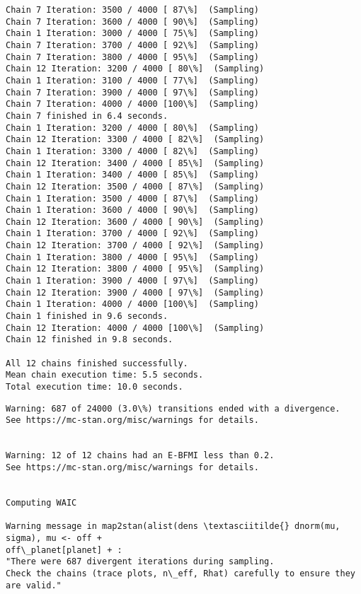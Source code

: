 \documentclass[11pt]{article}
\begin{document}
\begin{Verbatim}[commandchars=\\\{\}]
Chain 7 Iteration: 3500 / 4000 [ 87\%]  (Sampling)
Chain 7 Iteration: 3600 / 4000 [ 90\%]  (Sampling)
Chain 1 Iteration: 3000 / 4000 [ 75\%]  (Sampling)
Chain 7 Iteration: 3700 / 4000 [ 92\%]  (Sampling)
Chain 7 Iteration: 3800 / 4000 [ 95\%]  (Sampling)
Chain 12 Iteration: 3200 / 4000 [ 80\%]  (Sampling)
Chain 1 Iteration: 3100 / 4000 [ 77\%]  (Sampling)
Chain 7 Iteration: 3900 / 4000 [ 97\%]  (Sampling)
Chain 7 Iteration: 4000 / 4000 [100\%]  (Sampling)
Chain 7 finished in 6.4 seconds.
Chain 1 Iteration: 3200 / 4000 [ 80\%]  (Sampling)
Chain 12 Iteration: 3300 / 4000 [ 82\%]  (Sampling)
Chain 1 Iteration: 3300 / 4000 [ 82\%]  (Sampling)
Chain 12 Iteration: 3400 / 4000 [ 85\%]  (Sampling)
Chain 1 Iteration: 3400 / 4000 [ 85\%]  (Sampling)
Chain 12 Iteration: 3500 / 4000 [ 87\%]  (Sampling)
Chain 1 Iteration: 3500 / 4000 [ 87\%]  (Sampling)
Chain 1 Iteration: 3600 / 4000 [ 90\%]  (Sampling)
Chain 12 Iteration: 3600 / 4000 [ 90\%]  (Sampling)
Chain 1 Iteration: 3700 / 4000 [ 92\%]  (Sampling)
Chain 12 Iteration: 3700 / 4000 [ 92\%]  (Sampling)
Chain 1 Iteration: 3800 / 4000 [ 95\%]  (Sampling)
Chain 12 Iteration: 3800 / 4000 [ 95\%]  (Sampling)
Chain 1 Iteration: 3900 / 4000 [ 97\%]  (Sampling)
Chain 12 Iteration: 3900 / 4000 [ 97\%]  (Sampling)
Chain 1 Iteration: 4000 / 4000 [100\%]  (Sampling)
Chain 1 finished in 9.6 seconds.
Chain 12 Iteration: 4000 / 4000 [100\%]  (Sampling)
Chain 12 finished in 9.8 seconds.

All 12 chains finished successfully.
Mean chain execution time: 5.5 seconds.
Total execution time: 10.0 seconds.

    \end{Verbatim}

    \begin{Verbatim}[commandchars=\\\{\}]
Warning: 687 of 24000 (3.0\%) transitions ended with a divergence.
See https://mc-stan.org/misc/warnings for details.


Warning: 12 of 12 chains had an E-BFMI less than 0.2.
See https://mc-stan.org/misc/warnings for details.


Computing WAIC

Warning message in map2stan(alist(dens \textasciitilde{} dnorm(mu, sigma), mu <- off +
off\_planet[planet] + :
"There were 687 divergent iterations during sampling.
Check the chains (trace plots, n\_eff, Rhat) carefully to ensure they are valid."
    \end{Verbatim}
\end{document}
